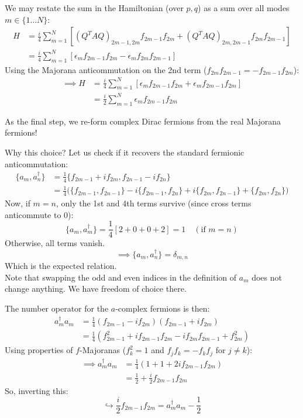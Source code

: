 \documentclass[11pt,a4paper]{article}
\begin{document}
We may restate the sum in the Hamiltonian (over $p, q$) as a sum over all modes $m \in \{1 \dots N\}$:
\begin{align*}
H &= \frac{i}{4} \sum_{m=1}^{N} \left[ (Q^T A Q)_{2m-1, 2m} f_{2m-1} f_{2m} + (Q^T A Q)_{2m, 2m-1} f_{2m} f_{2m-1} \right] \\
&= \frac{i}{4} \sum_{m=1}^{N} \left[ \epsilon_m f_{2m-1} f_{2m} - \epsilon_m f_{2m} f_{2m-1} \right]
\end{align*}
Using the Majorana anticommutation on the 2nd term ($f_{2m}f_{2m-1} = -f_{2m-1}f_{2m}$):
\begin{align*}
\implies H &= \frac{i}{4} \sum_{m=1}^{N} \left[ \epsilon_m f_{2m-1} f_{2m} + \epsilon_m f_{2m-1} f_{2m} \right] \\
&= \frac{i}{2} \sum_{m=1}^{N} \epsilon_m f_{2m-1} f_{2m}
\end{align*}

As the final step, we re-form complex Dirac fermions from the real Majorana fermions!


Why this choice? Let us check if it recovers the standard fermionic anticommutation:
\begin{align*}
\{a_m, a_n^\dagger\} &= \frac{1}{4} \{f_{2m-1} + i f_{2m}, f_{2n-1} - i f_{2n}\} \\
&= \frac{1}{4} \Big( \{f_{2m-1}, f_{2n-1}\} - i\{f_{2m-1}, f_{2n}\} + i\{f_{2m}, f_{2n-1}\} + \{f_{2m}, f_{2n}\} \Big)
\end{align*}
Now, if $m = n$, only the 1st and 4th terms survive (since cross terms anticommute to $0$):
\begin{equation*}
\{a_m, a_m^\dagger\} = \frac{1}{4} [2 + 0 + 0 + 2] = 1 \quad (\text{if } m=n)
\end{equation*}
Otherwise, all terms vanish.
\begin{equation*}
\implies \{a_m, a_n^\dagger\} = \delta_{m,n}
\end{equation*}
Which is the expected relation. \\
Note that swapping the odd and even indices in the definition of $a_m$ does not change anything. We have freedom of choice there.

The number operator for the $a$-complex fermions is then:
\begin{align*}
a_m^\dagger a_m &= \frac{1}{4}(f_{2m-1} - i f_{2m})(f_{2m-1} + i f_{2m}) \\
&= \frac{1}{4}(f_{2m-1}^2 + i f_{2m-1} f_{2m} - i f_{2m} f_{2m-1} + f_{2m}^2)
\end{align*}
Using properties of $f$-Majoranas ($f_k^2 = 1$ and $f_j f_k = -f_k f_j$ for $j \neq k$):
\begin{align*}
\implies a_m^\dagger a_m &= \frac{1}{4}(1 + 1 + 2i f_{2m-1} f_{2m}) \\
&= \frac{1}{2} + \frac{i}{2} f_{2m-1} f_{2m}
\end{align*}
So, inverting this:
\begin{equation*}
\hookrightarrow \frac{i}{2} f_{2m-1} f_{2m} = a_m^\dagger a_m - \frac{1}{2}
\end{equation*}
\end{document}
